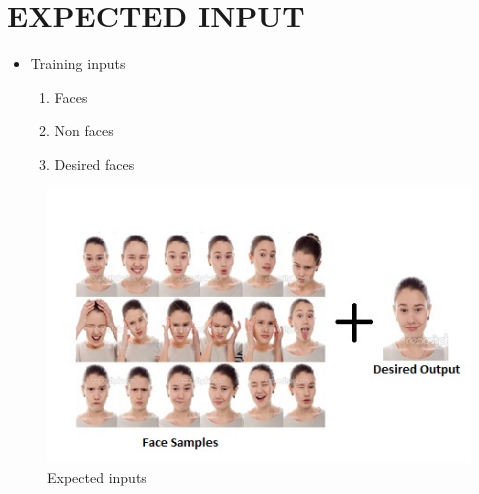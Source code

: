 \documentclass[10pt,a4paper,twoside]{report}
\begin{document}
\chapter{EXPECTED INPUT}
\begin{itemize}
\item Training inputs
\begin{enumerate}
\item Faces
\item Non faces
\item Desired faces
\end{enumerate}

\end{itemize}
\begin{figure}[htpb]
\begin{center}
\includegraphics[scale=1]{input.jpg}
\caption{Expected inputs}
\end{center}
\end{figure}
\newpage
\end{document}
